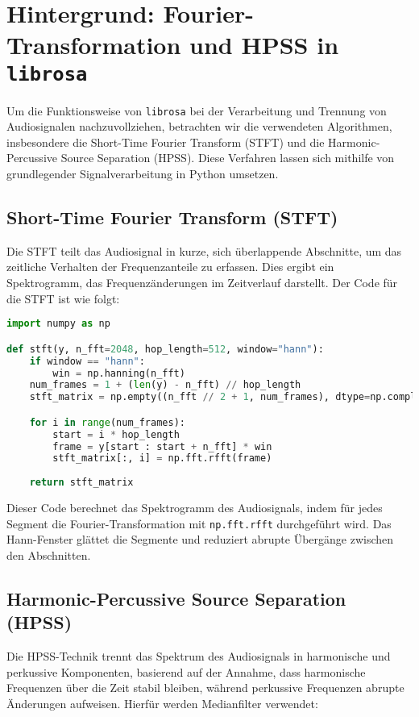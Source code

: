 \section{Hintergrund: Fourier-Transformation und HPSS in \texttt{librosa}}

Um die Funktionsweise von \texttt{librosa} bei der Verarbeitung und Trennung von Audiosignalen nachzuvollziehen, betrachten wir die verwendeten Algorithmen, insbesondere die Short-Time Fourier Transform (STFT) und die Harmonic-Percussive Source Separation (HPSS). Diese Verfahren lassen sich mithilfe von grundlegender Signalverarbeitung in Python umsetzen.

\subsection{Short-Time Fourier Transform (STFT)}

Die STFT teilt das Audiosignal in kurze, sich überlappende Abschnitte, um das zeitliche Verhalten der Frequenzanteile zu erfassen. Dies ergibt ein Spektrogramm, das Frequenzänderungen im Zeitverlauf darstellt. Der Code für die STFT ist wie folgt:

\begin{lstlisting}[language=Python, caption={STFT-Implementierung}]
import numpy as np

def stft(y, n_fft=2048, hop_length=512, window="hann"):
    if window == "hann":
        win = np.hanning(n_fft)
    num_frames = 1 + (len(y) - n_fft) // hop_length
    stft_matrix = np.empty((n_fft // 2 + 1, num_frames), dtype=np.complex64)

    for i in range(num_frames):
        start = i * hop_length
        frame = y[start : start + n_fft] * win
        stft_matrix[:, i] = np.fft.rfft(frame)
    
    return stft_matrix
\end{lstlisting}

Dieser Code berechnet das Spektrogramm des Audiosignals, indem für jedes Segment die Fourier-Transformation mit \texttt{np.fft.rfft} durchgeführt wird. Das Hann-Fenster glättet die Segmente und reduziert abrupte Übergänge zwischen den Abschnitten.

\subsection{Harmonic-Percussive Source Separation (HPSS)}

Die HPSS-Technik trennt das Spektrum des Audiosignals in harmonische und perkussive Komponenten, basierend auf der Annahme, dass harmonische Frequenzen über die Zeit stabil bleiben, während perkussive Frequenzen abrupte Änderungen aufweisen. Hierfür werden Medianfilter verwendet:

